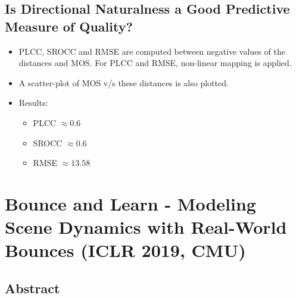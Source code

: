 \documentclass{article}
\begin{document}
    \subsection{Is Directional Naturalness a Good Predictive Measure of Quality?}\label{subsec:Spatio_Temporal_Measures_Of_Naturalness:is-directional-naturalness-a-good-predictive-measure-of-quality?}
    \begin{itemize}
        \item PLCC, SROCC and RMSE are computed between negative values of the distances and MOS\@.
        For PLCC and RMSE, non-linear mapping is applied.
        \item A scatter-plot of MOS v/s these distances is also plotted.
        \item Results:
        \begin{itemize}
            \item PLCC $\approx 0.6$
            \item SROCC $\approx 0.6$
            \item RMSE $\approx 13.58$
        \end{itemize}
    \end{itemize}
    \newpage


    \section{Bounce and Learn - Modeling Scene Dynamics with Real-World Bounces (ICLR 2019, CMU)}\label{sec:Bounce_and_Learn_Modeling_Scene_Dynamics_with_Real_World_Bounces_(ICLR_2019,_CMU)}
    \subsection*{Abstract}
\end{document}

